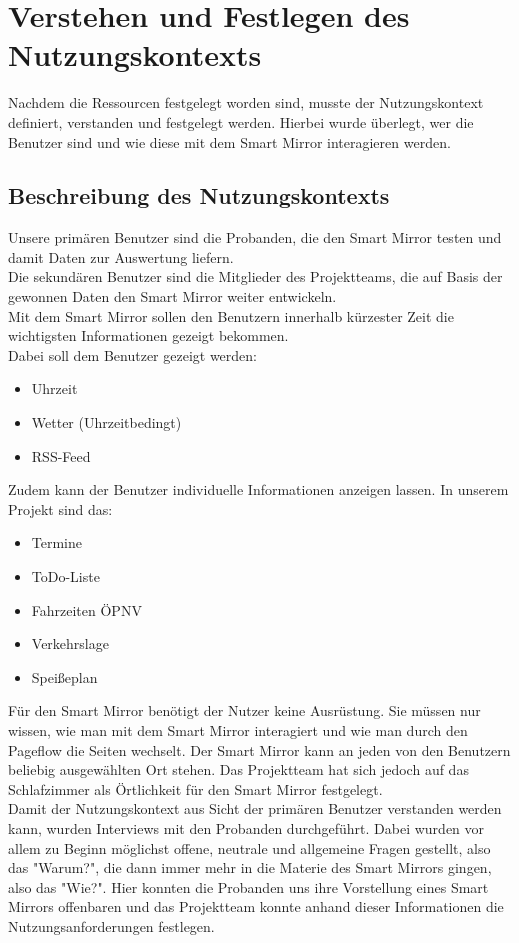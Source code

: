 \documentclass[12pt, a4paper]{scrartcl}
\begin{document}
	\newpage
	
	\section{Verstehen und Festlegen des Nutzungskontexts}
	Nachdem die Ressourcen festgelegt worden sind, musste der Nutzungskontext definiert, verstanden und festgelegt werden. Hierbei wurde überlegt, wer die Benutzer sind und wie diese mit dem Smart Mirror interagieren werden.
	\subsection{Beschreibung des Nutzungskontexts}
	Unsere primären Benutzer sind die Probanden, die den Smart Mirror testen und damit Daten zur Auswertung liefern.\\
	Die sekundären Benutzer sind die Mitglieder des Projektteams, die auf Basis der gewonnen Daten den Smart Mirror weiter entwickeln.\\
	Mit dem Smart Mirror sollen den Benutzern innerhalb kürzester Zeit die wichtigsten Informationen gezeigt bekommen.\\
	Dabei soll dem Benutzer gezeigt werden:
	\begin{itemize}
		\setlength\itemsep{-0.5em}
		\item Uhrzeit
		\item Wetter (Uhrzeitbedingt)
		\item RSS-Feed
	\end{itemize}
	Zudem kann der Benutzer individuelle Informationen anzeigen lassen. In unserem Projekt sind das:
	\begin{itemize}
		\setlength\itemsep{-0.5em}
		\item Termine
		\item  ToDo-Liste
		\item Fahrzeiten ÖPNV
		\item Verkehrslage
		\item Speißeplan
	\end{itemize}
	Für den Smart Mirror benötigt der Nutzer keine Ausrüstung. Sie müssen nur wissen, wie man mit dem Smart Mirror interagiert und wie man durch den Pageflow die Seiten wechselt. Der Smart Mirror kann an jeden von den Benutzern beliebig ausgewählten Ort stehen. Das Projektteam hat sich jedoch auf das Schlafzimmer als Örtlichkeit für den Smart Mirror festgelegt.\\
	Damit der Nutzungskontext aus Sicht der primären Benutzer verstanden werden kann, wurden Interviews mit den Probanden durchgeführt.
	Dabei wurden vor allem zu Beginn möglichst offene, neutrale und allgemeine Fragen gestellt, also das "Warum?", die dann immer mehr in die Materie des Smart Mirrors gingen, also das "Wie?". Hier konnten die Probanden uns ihre Vorstellung eines Smart Mirrors offenbaren und das Projektteam konnte anhand dieser Informationen die Nutzungsanforderungen festlegen. 
	
\end{document}
